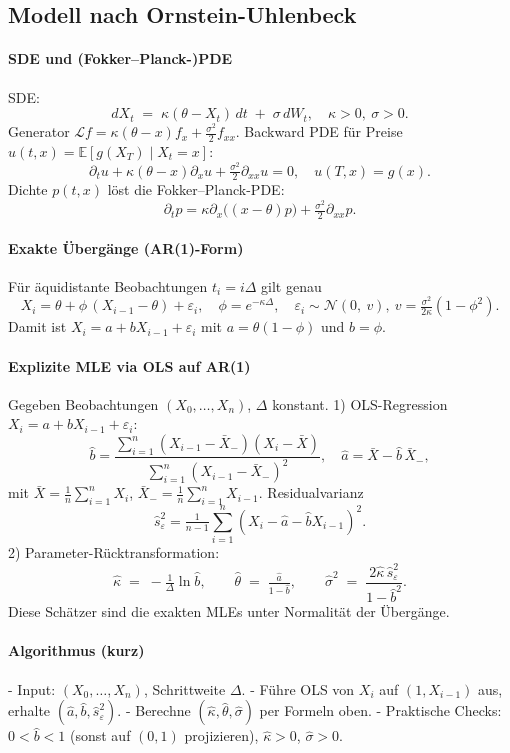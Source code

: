 \subsection{Modell nach Ornstein-Uhlenbeck}

\paragraph{SDE und (Fokker--Planck-)PDE}
SDE:
$$
dX_t \;=\; \kappa(\theta - X_t)\,dt \;+\; \sigma\,dW_t,\quad \kappa>0,\ \sigma>0.
$$
Generator $\mathcal L f = \kappa(\theta - x)f_x + \tfrac{\sigma^2}{2}f_{xx}$.
Backward PDE für Preise $u(t,x)=\mathbb E[g(X_T)\mid X_t=x]$:
$$
\partial_t u + \kappa(\theta-x)\partial_x u + \tfrac{\sigma^2}{2}\partial_{xx}u = 0,\quad u(T,x)=g(x).
$$
Dichte $p(t,x)$ löst die Fokker--Planck-PDE:
$$
\partial_t p = \kappa\partial_x\!\big((x-\theta)p\big) + \tfrac{\sigma^2}{2}\partial_{xx}p.
$$

\paragraph{Exakte Übergänge (AR(1)-Form)}
Für äquidistante Beobachtungen $t_i=i\Delta$ gilt genau
$$
X_{i} = \theta + \phi \,(X_{i-1}-\theta) + \varepsilon_i,\quad
\phi=e^{-\kappa\Delta},\quad
\varepsilon_i\sim \mathcal N\!\left(0,\ v\right),\ 
v=\tfrac{\sigma^2}{2\kappa}(1-\phi^2).
$$
Damit ist $X_i = a + b X_{i-1} + \varepsilon_i$ mit
$a=\theta(1-\phi)$ und $b=\phi$.

\paragraph{Explizite MLE via OLS auf AR(1)}
Gegeben Beobachtungen $(X_0,\dots,X_n)$, $\Delta$ konstant.
1) OLS-Regression $X_i = a + b X_{i-1} + \varepsilon_i$:
$$
\hat b=\frac{\sum_{i=1}^n(X_{i-1}-\bar X_{-})(X_i-\bar X)}
{\sum_{i=1}^n(X_{i-1}-\bar X_{-})^2},\quad
\hat a=\bar X - \hat b\,\bar X_{-},
$$
mit $\bar X=\tfrac1n\sum_{i=1}^n X_i$, $\bar X_{-}=\tfrac1n\sum_{i=1}^n X_{i-1}$.
Residualvarianz
$$
\hat s_\varepsilon^2=\tfrac1{n-1}\sum_{i=1}^n (X_i-\hat a-\hat b X_{i-1})^2.
$$
2) Parameter-Rücktransformation:
$$
\hat\kappa \;=\; -\tfrac1\Delta \ln \hat b,\qquad
\hat\theta \;=\; \tfrac{\hat a}{1-\hat b},\qquad
\hat\sigma^2 \;=\; \frac{2\hat\kappa\,\hat s_\varepsilon^2}{1-\hat b^2}.
$$
Diese Schätzer sind die exakten MLEs unter Normalität der Übergänge.

\paragraph{Algorithmus (kurz)}
- Input: $(X_0,\dots,X_n)$, Schrittweite $\Delta$.
- Führe OLS von $X_i$ auf $(1,X_{i-1})$ aus, erhalte $(\hat a,\hat b,\hat s_\varepsilon^2)$.
- Berechne $(\hat\kappa,\hat\theta,\hat\sigma)$ per Formeln oben.
- Praktische Checks: $0<\hat b<1$ (sonst auf $(0,1)$ projizieren), $\hat\kappa>0$, $\hat\sigma>0$.

